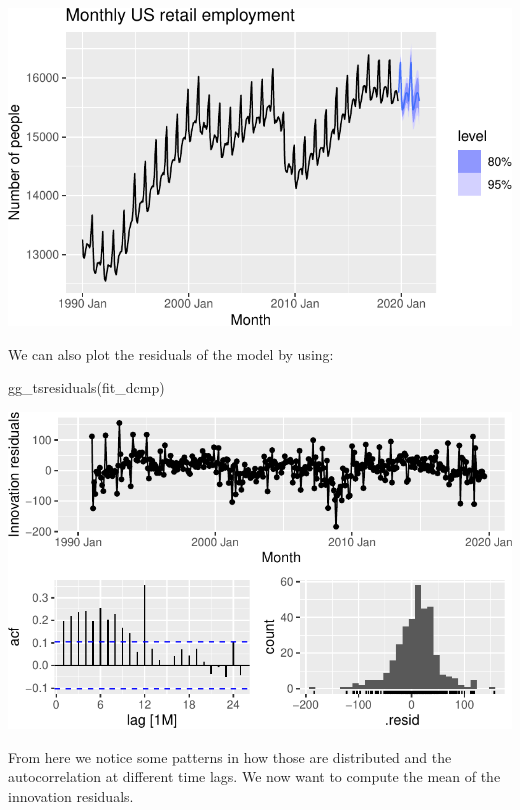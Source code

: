 \documentclass[
  letterpaper,
  DIV=11,
  numbers=noendperiod]{scrartcl}
\newenvironment{Shaded}{\begin{snugshade}}{\end{snugshade}}
\newcommand{\FunctionTok}[1]{\textcolor[rgb]{0.28,0.35,0.67}{#1}}
\newcommand{\NormalTok}[1]{\textcolor[rgb]{0.00,0.23,0.31}{#1}}
\begin{document}
\begin{center}
\includegraphics{chapter5_review_files/figure-pdf/unnamed-chunk-43-1.pdf}
\end{center}

We can also plot the residuals of the model by using:

\begin{Shaded}
\begin{Highlighting}[]
\FunctionTok{gg\_tsresiduals}\NormalTok{(fit\_dcmp)}
\end{Highlighting}
\end{Shaded}

\begin{center}
\includegraphics{chapter5_review_files/figure-pdf/unnamed-chunk-44-1.pdf}
\end{center}

From here we notice some patterns in how those are distributed and the
autocorrelation at different time lags. We now want to compute the mean
of the innovation residuals.
\end{document}
